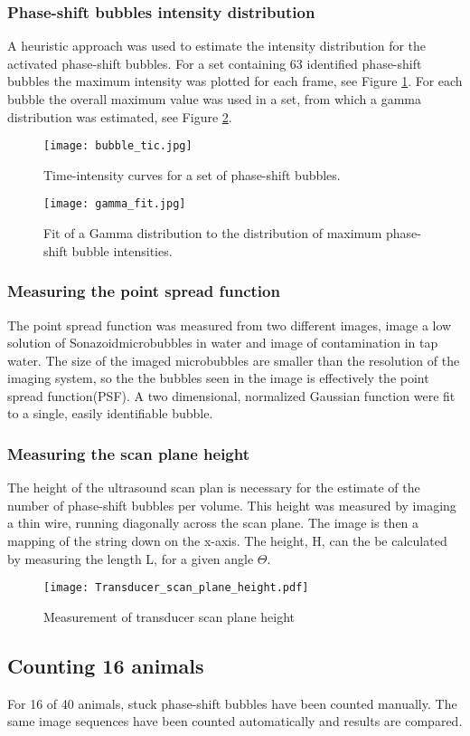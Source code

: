 \subsubsection{Phase-shift bubbles intensity distribution}
\label{PS intensity distribution}
A heuristic approach was used to estimate the intensity distribution for the activated phase-shift bubbles. For a set containing 63 identified phase-shift bubbles the maximum intensity was plotted for each frame, see Figure \ref{Fig:bubble_tic}. For each bubble the overall maximum value was used in a set, from which a gamma distribution was estimated, see Figure \ref{Fig:gamma_fit}.

\begin{figure}[h]
  \centering
  \label{Fig:bubble_tic}
  \texttt{[image: bubble\_tic.jpg]}
  \caption{Time-intensity curves for a set of phase-shift bubbles.}
\end{figure}
\begin{figure}[h]
  \centering
  \label{Fig:gamma_fit}
  \texttt{[image: gamma\_fit.jpg]}
  \caption{Fit of a Gamma distribution to the distribution of maximum phase-shift bubble intensities.}
\end{figure}

\subsubsection{Measuring the point spread function}
The point spread function was measured from two different images, image a low solution of Sonazoid\texttrademark microbubbles in water and image of contamination in tap water. The size of the imaged microbubbles are smaller than the resolution of the imaging system, so the the bubbles seen in the image is effectively the point spread function(PSF). A two dimensional, normalized Gaussian function were fit to a single, easily identifiable bubble. 

 
\subsubsection{Measuring the scan plane height}
The height of the ultrasound scan plan is necessary for the estimate of the number of phase-shift bubbles per volume. This height was measured by imaging a thin wire, running diagonally across the scan plane. The image is then a mapping of the string down on the x-axis. The height, H,  can the be calculated by measuring the length L, for a given angle $\Theta$.

\begin{figure}[h]
  \centering
  \texttt{[image: Transducer\_scan\_plane\_height.pdf]}
  \caption{Measurement of transducer scan plane height}
\end{figure}

\subsection{Counting 16 animals}
For 16 of 40 animals, stuck phase-shift bubbles have been counted manually\cite{Healey2014}. The same image sequences have been counted automatically and results are compared. 

